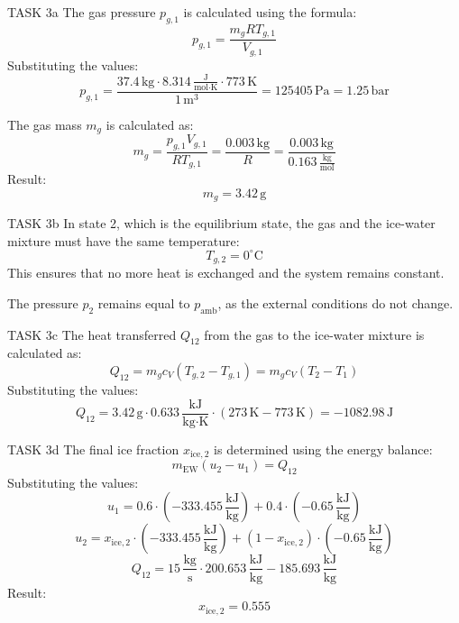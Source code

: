 TASK 3a  
The gas pressure \( p_{g,1} \) is calculated using the formula:  
\[
p_{g,1} = \frac{m_g R T_{g,1}}{V_{g,1}}
\]  
Substituting the values:  
\[
p_{g,1} = \frac{37.4 \, \text{kg} \cdot 8.314 \, \frac{\text{J}}{\text{mol·K}} \cdot 773 \, \text{K}}{1 \, \text{m}^3} = 125405 \, \text{Pa} = 1.25 \, \text{bar}
\]  

The gas mass \( m_g \) is calculated as:  
\[
m_g = \frac{p_{g,1} V_{g,1}}{R T_{g,1}} = \frac{0.003 \, \text{kg}}{R} = \frac{0.003 \, \text{kg}}{0.163 \, \frac{\text{kg}}{\text{mol}}}
\]  
Result:  
\[
m_g = 3.42 \, \text{g}
\]  

TASK 3b  
In state 2, which is the equilibrium state, the gas and the ice-water mixture must have the same temperature:  
\[
T_{g,2} = 0^\circ \text{C}
\]  
This ensures that no more heat is exchanged and the system remains constant.  

The pressure \( p_2 \) remains equal to \( p_{\text{amb}} \), as the external conditions do not change.  

TASK 3c  
The heat transferred \( Q_{12} \) from the gas to the ice-water mixture is calculated as:  
\[
Q_{12} = m_g c_V (T_{g,2} - T_{g,1}) = m_g c_V (T_2 - T_1)
\]  
Substituting the values:  
\[
Q_{12} = 3.42 \, \text{g} \cdot 0.633 \, \frac{\text{kJ}}{\text{kg·K}} \cdot (273 \, \text{K} - 773 \, \text{K}) = -1082.98 \, \text{J}
\]  

TASK 3d  
The final ice fraction \( x_{\text{ice},2} \) is determined using the energy balance:  
\[
m_{\text{EW}} (u_2 - u_1) = Q_{12}
\]  
Substituting the values:  
\[
u_1 = 0.6 \cdot (-333.455 \, \frac{\text{kJ}}{\text{kg}}) + 0.4 \cdot (-0.65 \, \frac{\text{kJ}}{\text{kg}})
\]  
\[
u_2 = x_{\text{ice},2} \cdot (-333.455 \, \frac{\text{kJ}}{\text{kg}}) + (1 - x_{\text{ice},2}) \cdot (-0.65 \, \frac{\text{kJ}}{\text{kg}})
\]  
\[
Q_{12} = 15 \, \frac{\text{kg}}{\text{s}} \cdot 200.653 \, \frac{\text{kJ}}{\text{kg}} - 185.693 \, \frac{\text{kJ}}{\text{kg}}
\]  
Result:  
\[
x_{\text{ice},2} = 0.555
\]  